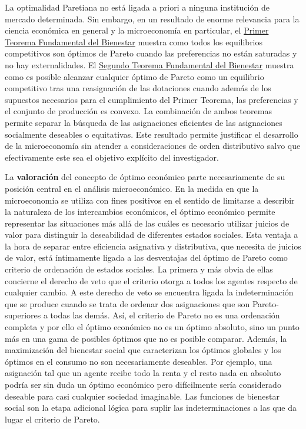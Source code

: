 \documentclass{nuevotema}
\begin{document}
La optimalidad Paretiana no está ligada a priori a ninguna institución de mercado determinada. Sin embargo, en un resultado de enorme relevancia para la ciencia económica en general y la microeconomía en particular, el \underline{Primer Teorema Fundamental del Bienestar} muestra como todos los equilibrios competitivos son óptimos de Pareto cuando las preferencias no están saturadas y no hay externalidades. El \underline{Segundo Teorema Fundamental del Bienestar} muestra como es posible alcanzar cualquier óptimo de Pareto como un equilibrio competitivo tras una reasignación de las dotaciones cuando además de los supuestos necesarios para el cumplimiento del Primer Teorema, las preferencias y el conjunto de producción es convexo. La combinación de ambos teoremas permite separar la búsqueda de las asignaciones eficientes de las asignaciones socialmente deseables o equitativas. Este resultado permite justificar el desarrollo de la microeconomía sin atender a consideraciones de orden distributivo salvo que efectivamente este sea el objetivo explícito del investigador.

La \textbf{valoración} del concepto de óptimo económico parte necesariamente de su posición central en el análisis microeconómico. En la medida en que la microeconomía se utiliza con fines positivos en el sentido de limitarse a describir la naturaleza de los intercambios económicos, el óptimo económico permite representar las situaciones más allá de las cuáles es necesario utilizar juicios de valor para distinguir la deseabilidad de diferentes estados sociales. Esta ventaja a la hora de separar entre eficiencia asignativa y distributiva, que necesita de juicios de valor, está íntimamente ligada a las desventajas del óptimo de Pareto como criterio de ordenación de estados sociales. La primera y más obvia de ellas concierne el derecho de veto que el criterio otorga a todos los agentes respecto de cualquier cambio. A este derecho de veto se encuentra ligada la indeterminación que se produce cuando se trata de ordenar dos asignaciones que son Pareto-superiores a todas las demás. Así, el criterio de Pareto no es una ordenación completa y por ello el óptimo económico no es un óptimo absoluto, sino un punto más en una gama de posibles óptimos que no es posible comparar. Además, la maximización del bienestar social que caracterizan los óptimos globales y los óptimos en el consumo no son necesariamente deseables. Por ejemplo, una asignación tal que un agente recibe todo la renta y el resto nada en absoluto podría ser sin duda un óptimo económico pero difícilmente sería considerado deseable para casi cualquier sociedad imaginable. Las funciones de bienestar social son la etapa adicional lógica para suplir las indeterminaciones a las que da lugar el criterio de Pareto. 
\end{document}
